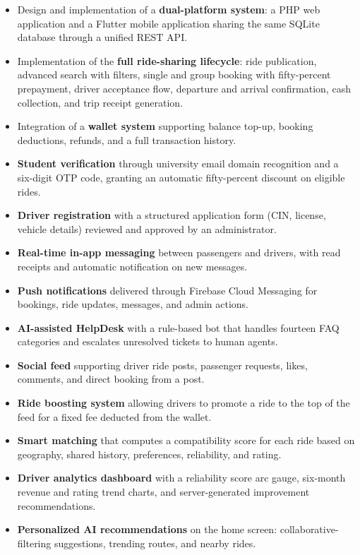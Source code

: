 \begin{itemize}[noitemsep]
    \item Design and implementation of a \textbf{dual-platform system}: a PHP web application and a Flutter mobile application sharing the same SQLite database through a unified REST API.
    \item Implementation of the \textbf{full ride-sharing lifecycle}: ride publication, advanced search with filters, single and group booking with fifty-percent prepayment, driver acceptance flow, departure and arrival confirmation, cash collection, and trip receipt generation.
    \item Integration of a \textbf{wallet system} supporting balance top-up, booking deductions, refunds, and a full transaction history.
    \item \textbf{Student verification} through university email domain recognition and a six-digit OTP code, granting an automatic fifty-percent discount on eligible rides.
    \item \textbf{Driver registration} with a structured application form (CIN, license, vehicle details) reviewed and approved by an administrator.
    \item \textbf{Real-time in-app messaging} between passengers and drivers, with read receipts and automatic notification on new messages.
    \item \textbf{Push notifications} delivered through Firebase Cloud Messaging for bookings, ride updates, messages, and admin actions.
    \item \textbf{AI-assisted HelpDesk} with a rule-based bot that handles fourteen FAQ categories and escalates unresolved tickets to human agents.
    \item \textbf{Social feed} supporting driver ride posts, passenger requests, likes, comments, and direct booking from a post.
    \item \textbf{Ride boosting system} allowing drivers to promote a ride to the top of the feed for a fixed fee deducted from the wallet.
    \item \textbf{Smart matching} that computes a compatibility score for each ride based on geography, shared history, preferences, reliability, and rating.
    \item \textbf{Driver analytics dashboard} with a reliability score arc gauge, six-month revenue and rating trend charts, and server-generated improvement recommendations.
    \item \textbf{Personalized AI recommendations} on the home screen: collaborative-filtering suggestions, trending routes, and nearby rides.

\end{itemize}
